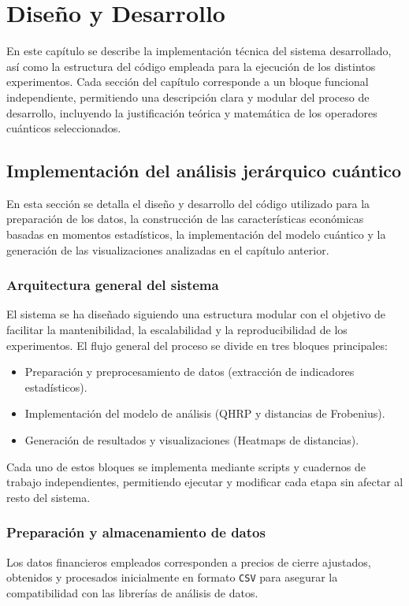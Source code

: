 \chapter{Diseño y Desarrollo}
\label{cap:diseno_desarrollo}

En este capítulo se describe la implementación técnica del sistema desarrollado, así como la estructura del código empleada para la ejecución de los distintos experimentos. Cada sección del capítulo corresponde a un bloque funcional independiente, permitiendo una descripción clara y modular del proceso de desarrollo, incluyendo la justificación teórica y matemática de los operadores cuánticos seleccionados.

\section{Implementación del análisis jerárquico cuántico}
\label{sec:implementacion_analisis}
En esta sección se detalla el diseño y desarrollo del código utilizado para la preparación de los datos, la construcción de las características económicas basadas en momentos estadísticos, la implementación del modelo cuántico y la generación de las visualizaciones analizadas en el capítulo anterior.

\subsection{Arquitectura general del sistema}
\label{sec:arquitectura_sistema}

El sistema se ha diseñado siguiendo una estructura modular con el objetivo de facilitar la mantenibilidad, la escalabilidad y la reproducibilidad de los experimentos. El flujo general del proceso se divide en tres bloques principales:

\begin{itemize}
\item Preparación y preprocesamiento de datos (extracción de indicadores estadísticos).
\item Implementación del modelo de análisis (QHRP y distancias de Frobenius).
\item Generación de resultados y visualizaciones (Heatmaps de distancias).
\end{itemize}

Cada uno de estos bloques se implementa mediante scripts y cuadernos de trabajo independientes, permitiendo ejecutar y modificar cada etapa sin afectar al resto del sistema.

\subsection{Preparación y almacenamiento de datos}
\label{sec:preparacion_almacenamiento}
Los datos financieros empleados corresponden a precios de cierre ajustados, obtenidos y procesados inicialmente en formato \texttt{CSV} para asegurar la compatibilidad con las librerías de análisis de datos. 

